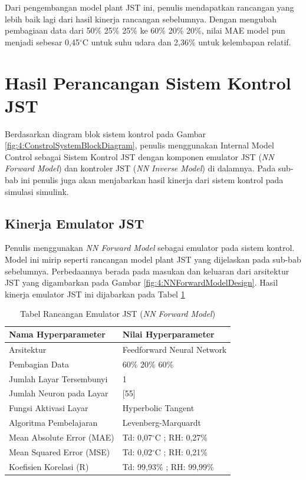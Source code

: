 Dari pengembangan model plant JST ini, penulis mendapatkan rancangan yang lebih baik lagi dari hasil kinerja rancangan sebelumnya. Dengan mengubah pembagiaan data dari 50\% 25\% 25\% ke 60\% 20\% 20\%, nilai MAE model pun menjadi sebesar 0,45$^\circ$C untuk suhu udara dan 2,36\% untuk kelembapan relatif.

\section{Hasil Perancangan Sistem Kontrol JST}

Berdasarkan diagram blok sistem kontrol pada Gambar \ref{fig:4:ConstrolSystemBlockDiagram}, penulis menggunakan Internal Model Control sebagai Sistem Kontrol JST dengan komponen emulator JST (\textit{NN Forward Model}) dan kontroler JST (\textit{NN Inverse Model}) di dalamnya. Pada sub-bab ini penulis juga akan menjabarkan hasil kinerja dari sistem kontrol pada simulasi simulink.

\subsection{Kinerja Emulator JST}

Penulis menggunakan \textit{NN Forward Model} sebagai emulator pada sistem kontrol. Model ini mirip seperti rancangan model plant JST yang dijelaskan pada sub-bab sebelumnya. Perbedaannya berada pada masukan dan keluaran dari arsitektur JST yang digambarkan pada Gambar \ref{fig:4:NNForwardModelDesign}. Hasil kinerja emulator JST ini dijabarkan pada Tabel \ref{tbl:5:NNEmulator}

\begin{table}[!hbt]
	\caption{Tabel Rancangan Emulator JST (\textit{NN Forward Model})}
	\label{tbl:5:NNEmulator}
	\centering
	\begin{tabular}{|p{5.7cm}|p{5cm}|}
		\hline
		\textbf{Nama Hyperparameter} & \textbf{Nilai Hyperparameter} \\ \hline
		Arsitektur & Feedforward Neural Network \\ \hline
		Pembagian Data & 60\% 20\% 60\% \\ \hline 
		Jumlah Layar Tersembunyi & 1 \\ \hline
		Jumlah Neuron pada Layar & [55] \\ \hline
		Fungsi Aktivasi Layar & Hyperbolic Tangent \\ \hline
		Algoritma Pembelajaran & Levenberg-Marquardt \\ \hline
		Mean Absolute Error (MAE) & Td: 0,07$^\circ$C ; RH: 0,27\% \\ \hline
		Mean Squared Error (MSE) & Td: 0,02$^\circ$C ; RH: 0,21\% \\ \hline
		Koefisien Korelasi (R) & Td: 99,93\% ; RH: 99,99\% \\ \hline
	\end{tabular}
\end{table}

